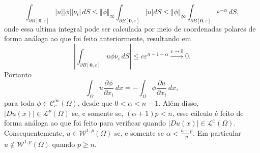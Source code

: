 \documentclass[a4paper, 11pt]{book}
\theoremstyle{definition}
\newcommand{\cC}{\mathcal{C}}
\newcommand{\cL}{\mathcal{L}}
\newcommand{\cW}{\mathcal{W}}
\begin{document}
\begin{ex}
\[        %
        \int_{\partial B[\mathbf{0},\varepsilon]} |u| |\phi| |\nu_i| \,dS \leqslant \Vert \phi \Vert_{\infty}\int_{\partial B[\mathbf{0},\varepsilon]} |u|dS \leqslant \Vert \phi \Vert_{\infty}\int_{\partial B[\mathbf{0},\varepsilon]} \varepsilon^{-\alpha} \,dS,
    \]
    onde essa ultima integral pode ser calculada por meio de coordenadas polares de forma análoga ao que foi feito anteriormente, resultando em
    \[
        \left| \int_{\partial B[\mathbf{0},\varepsilon]} u \phi \nu_i \,dS \right| \leqslant c \varepsilon^{n-1-\alpha} \overset{\varepsilon \to 0}{\longrightarrow} 0.
    \]
    Portanto
    \[
        \int_{\Omega} u \dfrac{\partial \phi}{\partial x_i} \, dx = -\int_{\Omega} \phi \dfrac{\partial u}{\partial x_i} \,dx,
    \]
    para toda $\phi \in \cC^\infty_c(\Omega)$, desde que $0 < \alpha < n-1$. 
    Além disso, $|Du(x)| \in \cL^p(\Omega)$ se, e somente se, $(\alpha + 1)p < n$, esse cálculo é feito de forma análoga ao que foi feito para verificar quando $|Du(x)| \in \cL^1(\Omega)$. Consequentemente, $u \in \cW^{1,p}(\Omega)$ se, e somente se $\alpha < \frac{n-p}{p}$.
    Em particular $u \not\in \cW^{1,p}(\Omega)$ quando $p \geqslant n$.
\end{ex}
\end{document}
